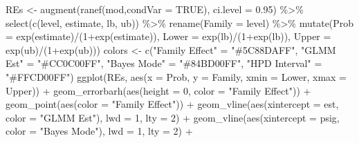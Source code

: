 \documentclass[12pt]{article}
\newenvironment{Shaded}{\begin{snugshade}}{\end{snugshade}}
\newcommand{\AttributeTok}[1]{\textcolor[rgb]{0.77,0.63,0.00}{#1}}
\newcommand{\ConstantTok}[1]{\textcolor[rgb]{0.00,0.00,0.00}{#1}}
\newcommand{\DecValTok}[1]{\textcolor[rgb]{0.00,0.00,0.81}{#1}}
\newcommand{\FloatTok}[1]{\textcolor[rgb]{0.00,0.00,0.81}{#1}}
\newcommand{\FunctionTok}[1]{\textcolor[rgb]{0.00,0.00,0.00}{#1}}
\newcommand{\NormalTok}[1]{#1}
\newcommand{\OtherTok}[1]{\textcolor[rgb]{0.56,0.35,0.01}{#1}}
\newcommand{\SpecialCharTok}[1]{\textcolor[rgb]{0.00,0.00,0.00}{#1}}
\newcommand{\StringTok}[1]{\textcolor[rgb]{0.31,0.60,0.02}{#1}}
\begin{document}
\begin{Shaded}
\begin{Highlighting}[]
\NormalTok{REs }\OtherTok{\textless{}{-}} \FunctionTok{augment}\NormalTok{(}\FunctionTok{ranef}\NormalTok{(mod,}\AttributeTok{condVar =} \ConstantTok{TRUE}\NormalTok{), }\AttributeTok{ci.level =} \FloatTok{0.95}\NormalTok{) }\SpecialCharTok{\%\textgreater{}\%}
  \FunctionTok{select}\NormalTok{(}\FunctionTok{c}\NormalTok{(level, estimate, lb, ub)) }\SpecialCharTok{\%\textgreater{}\%}
  \FunctionTok{rename}\NormalTok{(}\AttributeTok{Family =}\NormalTok{ level) }\SpecialCharTok{\%\textgreater{}\%}
  \FunctionTok{mutate}\NormalTok{(}\AttributeTok{Prob =} \FunctionTok{exp}\NormalTok{(estimate)}\SpecialCharTok{/}\NormalTok{(}\DecValTok{1}\SpecialCharTok{+}\FunctionTok{exp}\NormalTok{(estimate)),}
         \AttributeTok{Lower =} \FunctionTok{exp}\NormalTok{(lb)}\SpecialCharTok{/}\NormalTok{(}\DecValTok{1}\SpecialCharTok{+}\FunctionTok{exp}\NormalTok{(lb)),}
         \AttributeTok{Upper =} \FunctionTok{exp}\NormalTok{(ub)}\SpecialCharTok{/}\NormalTok{(}\DecValTok{1}\SpecialCharTok{+}\FunctionTok{exp}\NormalTok{(ub)))}
\NormalTok{colors }\OtherTok{\textless{}{-}} \FunctionTok{c}\NormalTok{(}\StringTok{"Family Effect"} \OtherTok{=} \StringTok{"\#5C88DAFF"}\NormalTok{, }\StringTok{"GLMM Est"} \OtherTok{=} \StringTok{"\#CC0C00FF"}\NormalTok{, }\StringTok{"Bayes Mode"} \OtherTok{=} \StringTok{"\#84BD00FF"}\NormalTok{,}
            \StringTok{"HPD Interval"} \OtherTok{=} \StringTok{"\#FFCD00FF"}\NormalTok{)}
\FunctionTok{ggplot}\NormalTok{(REs, }\FunctionTok{aes}\NormalTok{(}\AttributeTok{x =}\NormalTok{ Prob, }\AttributeTok{y =}\NormalTok{ Family, }\AttributeTok{xmin =}\NormalTok{ Lower, }\AttributeTok{xmax =}\NormalTok{ Upper)) }\SpecialCharTok{+}
  \FunctionTok{geom\_errorbarh}\NormalTok{(}\FunctionTok{aes}\NormalTok{(}\AttributeTok{height =} \DecValTok{0}\NormalTok{, }\AttributeTok{color =} \StringTok{"Family Effect"}\NormalTok{)) }\SpecialCharTok{+}
  \FunctionTok{geom\_point}\NormalTok{(}\FunctionTok{aes}\NormalTok{(}\AttributeTok{color =} \StringTok{"Family Effect"}\NormalTok{)) }\SpecialCharTok{+}
  \FunctionTok{geom\_vline}\NormalTok{(}\FunctionTok{aes}\NormalTok{(}\AttributeTok{xintercept =}\NormalTok{ est, }\AttributeTok{color =} \StringTok{"GLMM Est"}\NormalTok{), }\AttributeTok{lwd =} \DecValTok{1}\NormalTok{, }\AttributeTok{lty =} \DecValTok{2}\NormalTok{) }\SpecialCharTok{+}
  \FunctionTok{geom\_vline}\NormalTok{(}\FunctionTok{aes}\NormalTok{(}\AttributeTok{xintercept =}\NormalTok{ psig, }\AttributeTok{color =} \StringTok{"Bayes Mode"}\NormalTok{), }\AttributeTok{lwd =} \DecValTok{1}\NormalTok{, }\AttributeTok{lty =} \DecValTok{2}\NormalTok{) }\SpecialCharTok{+}

\end{Highlighting}
\end{Shaded}
\end{document}
